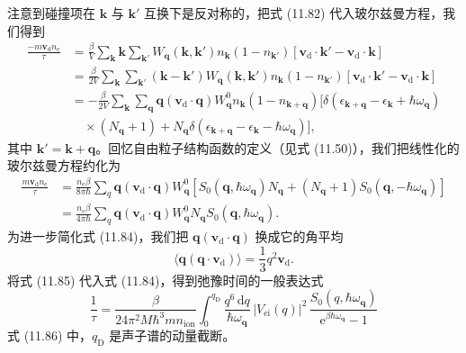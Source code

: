 注意到碰撞项在 $\mathbf{k}$ 与 $\mathbf{k}'$ 互换下是反对称的，把式 (11.82) 代入玻尔兹曼方程，我们得到
\begin{align*}
\frac{-m\mathbf{v}_{\mathrm{d}}n_{\mathrm{e}}}{\tau}&=\frac{\beta}{V}\sum_{\mathbf{k}}\mathbf{k}\sum_{\mathbf{k}'}W_{\mathbf{q}}(\mathbf{k},\mathbf{k}')n_{\mathbf{k}}(1-n_{\mathbf{k}'})[\mathbf{v}_{\mathrm{d}}\cdot\mathbf{k}'-\mathbf{v}_{\mathrm{d}}\cdot\mathbf{k}]\\
&=\frac{\beta}{2V}\sum_{\mathbf{k}}\sum_{\mathbf{k}'}(\mathbf{k}-\mathbf{k}')W_{\mathbf{q}}(\mathbf{k},\mathbf{k}')n_{\mathbf{k}}(1-n_{\mathbf{k}'})[\mathbf{v}_{\mathrm{d}}\cdot\mathbf{k}'-\mathbf{v}_{\mathrm{d}}\cdot\mathbf{k}]\\
&=-\frac{\beta}{2V}\sum_{\mathbf{k}}\sum_{\mathbf{q}}\mathbf{q}(\mathbf{v}_{\mathrm{d}}\cdot\mathbf{q})W^0_{\mathbf{q}}n_{\mathbf{k}}(1-n_{\mathbf{k}+\mathbf{q}})[\delta(\epsilon_{\mathbf{k}+\mathbf{q}}-\epsilon_{\mathbf{k}}+\hbar\omega_{\mathbf{q}})\\
&\quad\times(N_{\mathbf{q}}+1)+N_{\mathbf{q}}\delta(\epsilon_{\mathbf{k}+\mathbf{q}}-\epsilon_{\mathbf{k}}-\hbar\omega_{\mathbf{q}})],\tag{11.83}
\end{align*}
其中 $\mathbf{k}'=\mathbf{k}+\mathbf{q}$。回忆自由粒子结构函数的定义（见式 (11.50)），我们把线性化的玻尔兹曼方程约化为
\begin{align*}
\frac{m\mathbf{v}_{\mathrm{d}}n_{\mathrm{e}}}{\tau}&=\frac{n_{\mathrm{e}}\beta}{8\pi\hbar}\sum_q\mathbf{q}(\mathbf{v}_{\mathrm{d}}\cdot\mathbf{q})W^0_{\mathbf{q}}[S_0(\mathbf{q},\hbar\omega_{\mathbf{q}})N_{\mathbf{q}}+(N_{\mathbf{q}}+1)S_0(\mathbf{q},-\hbar\omega_{\mathbf{q}})]\\
&=\frac{n_{\mathrm{e}}\beta}{4\pi\hbar}\sum_q\mathbf{q}(\mathbf{v}_{\mathrm{d}}\cdot\mathbf{q})W^0_{\mathbf{q}}N_{\mathbf{q}}S_0(\mathbf{q},\hbar\omega_{\mathbf{q}}).\tag{11.84}
\end{align*}
为进一步简化式 (11.84)，我们把 $\mathbf{q}(\mathbf{v}_{\mathrm{d}}\cdot\mathbf{q})$ 换成它的角平均
\begin{equation*}
\langle\mathbf{q}(\mathbf{q}\cdot\mathbf{v}_{\mathrm{d}})\rangle=\frac{1}{3}q^2\mathbf{v}_{\mathrm{d}}.\tag{11.85}
\end{equation*}
将式 (11.85) 代入式 (11.84)，得到弛豫时间的一般表达式
\begin{equation*}
\frac{1}{\tau}=\frac{\beta}{24\pi^2M\hbar^3mn_{\mathrm{ion}}}\int_0^{q_{\mathrm{D}}}\frac{q^6\,\mathrm{d}q}{\hbar\omega_{\mathbf{q}}}\,|V_{\mathrm{ei}}(q)|^2\,\frac{S_0(q,\hbar\omega_{\mathbf{q}})}{\mathrm{e}^{\beta\hbar\omega_{\mathbf{q}}}-1}\tag{11.86}
\end{equation*}
式 (11.86) 中，$q_{\mathrm{D}}$ 是声子谱的动量截断。

